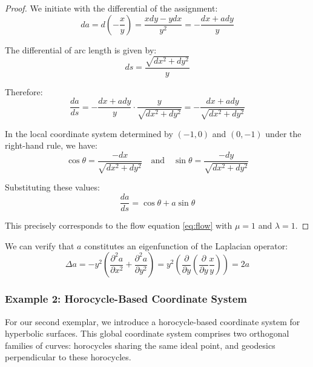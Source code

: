 \begin{proof}
We initiate with the differential of the assignment:
$$
da = d\left(-\frac{x}{y}\right) = \frac{xdy - ydx}{y^2} = -\frac{dx + ady}{y}
$$

The differential of arc length is given by:
$$
ds = \frac{\sqrt{dx^2 + dy^2}}{y}
$$

Therefore:
$$
\frac{da}{ds} = - \frac{dx + ady}{y} \cdot \frac{y}{\sqrt{dx^2 + dy^2}} = - \frac{dx + ady}{\sqrt{dx^2 + dy^2}}
$$

In the local coordinate system determined by $(-1, 0)$ and $(0, -1)$ under the right-hand rule, we have:
$$
\cos \theta = \frac{-dx}{\sqrt{dx^2 + dy^2}} \quad \text{and} \quad \sin \theta = \frac{-dy}{\sqrt{dx^2 + dy^2}}
$$

Substituting these values:
$$
\frac{da}{ds} = \cos \theta + a \sin \theta
$$

This precisely corresponds to the flow equation \eqref{eq:flow} with $\mu=1$ and $\lambda=1$.
\end{proof}

We can verify that $a$ constitutes an eigenfunction of the Laplacian operator:
$$
\Delta a = - y^2 \left(\frac{\partial^2 a}{\partial x^2} + \frac{\partial^2 a}{\partial y^2}\right) = y^2 \left(\frac{\partial}{\partial y} \left(\frac{\partial}{\partial y} \frac{x}{y}\right)\right) = 2a
$$

\subsubsection{Example 2: Horocycle-Based Coordinate System}

For our second exemplar, we introduce a horocycle-based coordinate system for hyperbolic surfaces. This global coordinate system comprises two orthogonal families of curves: horocycles sharing the same ideal point, and geodesics perpendicular to these horocycles.

